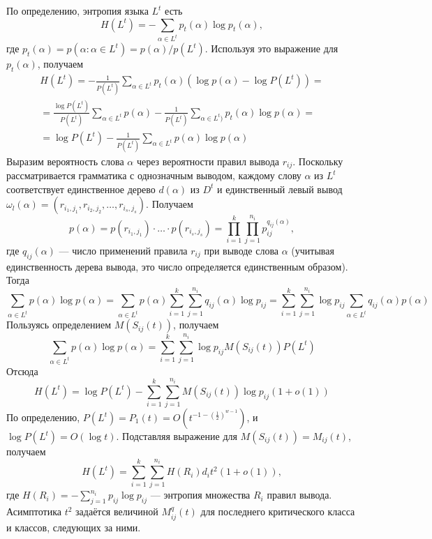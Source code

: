 \documentclass[12pt]{article}
\begin{document}
{По определению, энтропия языка $L^t$ есть
\begin{equation*}
	H(L^t) = - \sum_{\alpha \in L^t} p_t(\alpha) \log p_t(\alpha),
\end{equation*}
где $p_t(\alpha) = p(\alpha : \alpha \in L^t) = p(\alpha) / p(L^t)$. Используя это выражение для $p_t(\alpha)$, получаем
\begin{multline*}
	H(L^t) = - \frac{1}{P(L^t)} \sum_{\alpha \in L^t} p_t(\alpha) \left( \log p(\alpha) - \log P(L^t) \right) = \\
	= \frac{\log P(L^t)}{P(L^t)} \sum_{\alpha \in L^t} p(\alpha) - \frac{1}{P(L^t)} \sum_{\alpha \in L^t)} p_t(\alpha) \log p(\alpha) = \\
	= \log P(L^t) - \frac{1}{P(L^t)} \sum_{\alpha \in L^t} p(\alpha) \log p(\alpha)
\end{multline*}
Выразим вероятность слова $\alpha$ через вероятности правил вывода $r_{ij}$. Поскольку рассматривается грамматика с однозначным выводом, каждому слову $\alpha$ из $L^t$ соответствует единственное дерево $d(\alpha)$ из $D^t$ и единственный левый вывод $\omega_l(\alpha) = (r_{i_1,j_1}, r_{i_2,j_2}, \ldots, r_{i_s,j_s})$. Получаем
\begin{equation*}
	p(\alpha) = p(r_{i_1,j_1}) \cdot \ldots \cdot p(r_{i_s,j_s}) = \prod_{i=1}^k \prod_{j=1}^{n_i} p_{ij}^{q_{ij}(\alpha)},
\end{equation*}
где $q_{ij}(\alpha)$ --- число применений правила $r_{ij}$ при выводе слова $\alpha$ (учитывая единственность дерева вывода, это число определяется единственным образом). Тогда
\begin{equation*}
	\sum_{\alpha \in L^t} p(\alpha) \log p(\alpha) = \sum_{\alpha \in L^t} p(\alpha) \sum_{i=1}^k \sum_{j=1}^{n_i} q_{ij}(\alpha) \log p_{ij} = \sum_{i=1}^k \sum_{j=1}^{n_i} \log p_{ij} \sum_{\alpha \in L^t} q_{ij}(\alpha) p(\alpha)
\end{equation*}
Пользуясь определением $M(S_{ij}(t))$, получаем
\begin{equation*}
	\sum_{\alpha \in L^t} p(\alpha) \log p(\alpha) = \sum_{i=1}^k \sum_{j=1}^{n_i} \log p_{ij} M(S_{ij}(t)) P(L^t)
\end{equation*}
Отсюда
\begin{equation*}
	H(L^t) = \log P(L^t) - \sum_{i=1}^k \sum_{j=1}^{n_i} M(S_{ij}(t)) \log p_{ij} (1 + o(1))
\end{equation*}
По определению, $P(L^t) = P_1(t) = O(t^{-1 -\left(\frac{1}{2}\right)^{w-1}})$, и $\log P(L^t) = O(\log t)$. Подставляя выражение для $M(S_{ij}(t)) = M_{ij}(t)$, получаем
\begin{equation*}
	H(L^t) = \sum_{i=1}^k \sum_{j=1}^{n_i} H(R_i) d_i t^2 (1 + o(1)),
\end{equation*}
где $H(R_i) = - \sum_{j=1}^{n_i} p_{ij} \log p_{ij}$ --- энтропия множества $R_i$ правил вывода. Асимптотика $t^2$ задаётся величиной $M^q_{ij}(t)$ для последнего критического класса и классов, следующих за ними.

}
\end{document}
